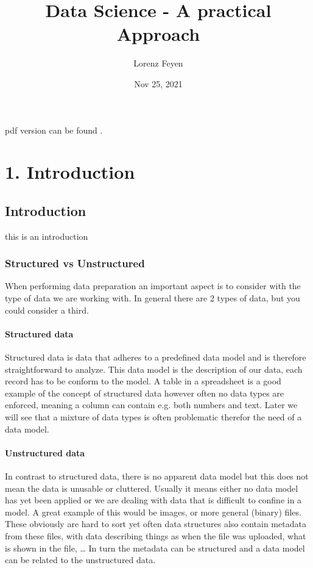 \documentclass[letterpaper,10pt,english]{jupyterBook}
\title{Data Science - A practical Approach}
\date{Nov 25, 2021}
\author{Lorenz Feyen}
\begin{document}
\pagestyle{empty}
\sphinxmaketitle
\pagestyle{plain}
\sphinxtableofcontents
\pagestyle{normal}
\label{\detokenize{foreword::doc}}


\sphinxAtStartPar
pdf version can be found .


\part{1. Introduction}


\chapter{Introduction}
\label{\detokenize{c1_introduction/introduction:introduction}}\label{\detokenize{c1_introduction/introduction::doc}}
\sphinxAtStartPar
this is an introduction


\section{Structured vs Unstructured}
\label{\detokenize{c1_introduction/introduction:structured-vs-unstructured}}
\sphinxAtStartPar
When performing data preparation an important aspect is to consider with the type of data we are working with.
In general there are 2 types of data, but you could consider a third.


\subsection{Structured data}
\label{\detokenize{c1_introduction/introduction:structured-data}}
\sphinxAtStartPar
Structured data is data that adheres to a pre\sphinxhyphen{}defined data model and is therefore straightforward to analyze.
This data model is the description of our data, each record has to be conform to the model.
A table in a spreadsheet is a good example of the concept of structured data however often no data types are enforced, meaning a column can contain e.g. both numbers and text.
Later we will see that a mixture of data types is often problematic therefor the need of a data model.


\subsection{Unstructured data}
\label{\detokenize{c1_introduction/introduction:unstructured-data}}
\sphinxAtStartPar
In contrast to structured data, there is no apparent data model but this does not mean the data is unusable or cluttered.
Usually it means either no data model has yet been applied or we are dealing with data that is difficult to confine in a model.
A great example of this would be images, or more general (binary) files.
These obviously are hard to sort yet often data structures also contain metadata from these files, with data describing things as when the file was uploaded, what is shown in the file, …
In turn the metadata can be structured and a data model can be related to the unstructured data.
\end{document}
